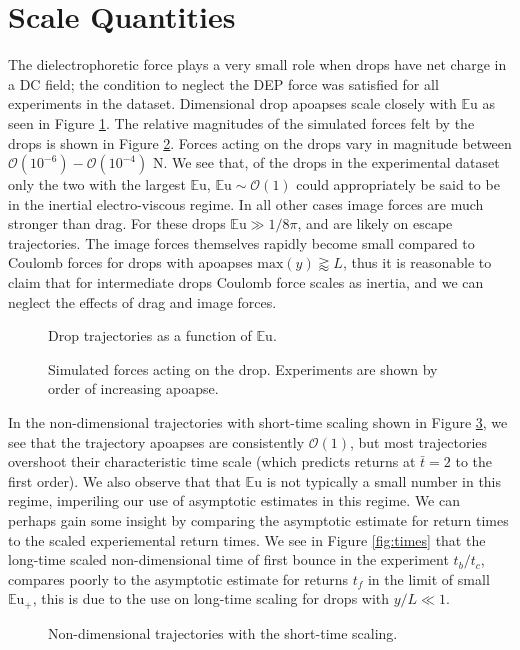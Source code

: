 \documentclass[12pt,a4paper,oneside]{book}
\begin{document}
\section{Scale Quantities}
The dielectrophoretic force plays a very small role when drops have net charge in a DC field; the condition to neglect the DEP force was satisfied for all experiments in the dataset. Dimensional drop apoapses scale closely with $\mathbb{E}\mbox{u}$ as seen in Figure \ref{fig:series_s_eu}. The relative magnitudes of the simulated forces felt by the drops is shown in Figure \ref{fig:forces}. Forces acting on the drops vary in magnitude between $\mathcal{O}(10^{-6})-\mathcal{O}(10^{-4})$ N. We see that, of the drops in the experimental dataset only the two with the largest $\mathbb{E}\mbox{u}$, $\mathbb{E}\mbox{u} \sim \mathcal{O}(1)$ could appropriately be said to be in the inertial electro-viscous regime. In all other cases image forces are much stronger than drag. For these drops $\mathbb{E}\mbox{u} \gg 1/8 \pi$, and are likely on escape trajectories. The image forces themselves rapidly become small compared to Coulomb forces for drops with apoapses $\mbox{max}\left( y\right) \gtrapprox L$, thus it is reasonable to claim that for intermediate drops Coulomb force scales as inertia, and we can neglect the effects of drag and image forces.

\begin{figure}[htb]
    \centering
    
    \caption{Drop trajectories as a function of $\mathbb{E}\mbox{u}$.\label{fig:series_s_eu}}
\end{figure}
\begin{figure}[htb]
    \centering
    \resizebox{14cm}{!}{}
    \caption{Simulated forces acting on the drop. Experiments are shown by order of increasing apoapse.\label{fig:forces}}
\end{figure}

In the non-dimensional trajectories with short-time scaling shown in Figure \ref{fig:series_s_ds}, we see that the trajectory apoapses are consistently $\mathcal{O}(1)$, but most trajectories overshoot their characteristic time scale (which predicts returns at $\bar{t}  =2$ to the first order). We also observe that that $\mathbb{E}\mbox{u}$ is not typically a small number in this regime, imperiling our use of asymptotic estimates in this regime. We can perhaps gain some insight by comparing the asymptotic estimate for return times to the scaled experiemental return times. We see in Figure \ref{fig:times} that the long-time scaled non-dimensional time of first bounce in the experiment $t_b / t_c$, compares poorly to the asymptotic estimate for returns $t_f$ in the limit of small $\mathbb{E}\mbox{u}_+$, this is due to the use on long-time scaling for drops with $y/L \ll 1$.   
\begin{figure}[htb]
    \centering
    
    \caption{Non-dimensional trajectories with the short-time scaling.\label{fig:series_s_ds}}
\end{figure}
\end{document}
